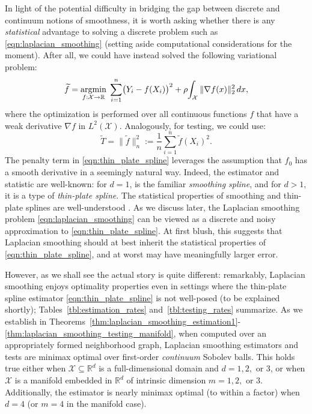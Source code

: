\documentclass[twoside]{article}
\newcommand{\Reals}{\mathbb{R}}
\newcommand{\1}{\mathbf{1}}
\DeclareMathOperator*{\argmin}{argmin}
\newcommand{\Rd}{\Reals^d}
\newcommand{\Xset}{\mathcal{X}}
\newcommand{\wt}[1]{\widetilde{#1}}
\newcommand{\wh}[1]{\widehat{#1}}
\theoremstyle{definition}
\theoremstyle{remark}
\begin{document}
In light of the potential difficulty in bridging the gap between discrete and continuum notions of smoothness, it is worth asking whether there is any \emph{statistical} advantage to solving a discrete problem such as \eqref{eqn:laplacian_smoothing} (setting aside computational considerations for the moment). After all, we could have instead solved the following variational problem:
\begin{equation}
\label{eqn:thin_plate_spline}
\wt{f} = \argmin_{f : \Xset \to \Reals} \; \sum_{i = 1}^{n} \bigl(Y_i - f(X_i)\bigr)^2 + \rho \hspace{-2pt} \int_{\Xset} \|\nabla f(x)\|_2^2 \,dx,
\end{equation}
where the optimization is performed over all continuous functions $f$ that have a weak derivative $\nabla f$ in $L^2(\Xset)$. Analogously, for testing, we could use:
\begin{equation}
\label{eqn:thin_plate_spline_test}
\wt{T} = \| \wt{f} \|_n^2 := \frac{1}{n} \sum_{i=1}^n \wt{f}(X_i)^2.
\end{equation}
The penalty term in \eqref{eqn:thin_plate_spline} leverages the assumption that $f_0$ has a smooth derivative in a seemingly natural way. Indeed, the estimator \smash{$\wt{f}$} and statistic \smash{$\wt{T}$} are well-known: for $d = 1$, \smash{$\wt{f}$} is the familiar \emph{smoothing spline}, and for $d>1$, it is a type of \emph{thin-plate spline}. The statistical properties of smoothing and thin-plate splines are well-understood \citep{vandergeer2000,liu2019}. As we discuss later, the Laplacian smoothing problem \eqref{eqn:laplacian_smoothing} can be viewed as a discrete and noisy approximation to \eqref{eqn:thin_plate_spline}. At first blush, this suggests that Laplacian smoothing should at best inherit the statistical properties of \eqref{eqn:thin_plate_spline}, and at worst may have meaningfully larger error.

However, as we shall see the actual story is quite different: remarkably, Laplacian smoothing enjoys optimality properties even in settings where the thin-plate spline estimator \eqref{eqn:thin_plate_spline} is not well-posed (to be explained shortly); Tables~\ref{tbl:estimation_rates} and~\ref{tbl:testing_rates} summarize. As we establish in Theorems~\ref{thm:laplacian_smoothing_estimation1}-\ref{thm:laplacian_smoothing_testing_manifold}, when computed over an appropriately formed neighborhood graph, Laplacian smoothing estimators and tests are minimax optimal over first-order \emph{continuum} Sobolev balls. This holds true either when $\Xset \subseteq \Rd$ is a full-dimensional domain and $d = 1,2,$ or $3$, or when $\Xset$ is a manifold embedded in $\Rd$ of intrinsic dimension $m = 1,2,$ or $3$. Additionally, the estimator \smash{$\wh{f}$} is nearly minimax optimal (to within a  factor) when $d=4$ (or $m=4$ in the manifold case). 
\end{document}
